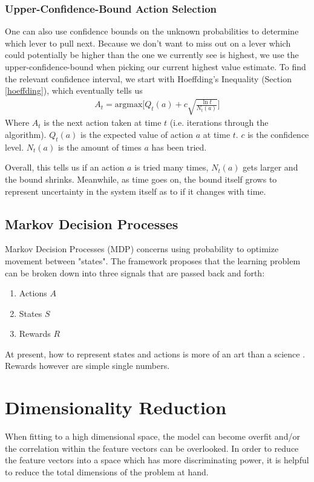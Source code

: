 \subsubsection{Upper-Confidence-Bound Action Selection}

One can also use confidence bounds on the unknown probabilities to determine which lever to pull next. Because we don't want to miss out on a lever which could potentially be higher than the one we currently see is highest, we use the upper-confidence-bound when picking our current highest value estimate. To find the relevant confidence interval, we start with Hoeffding's Inequality (Section \ref{hoeffding}), which eventually tells us
\begin{align}
	A_t = \textrm{argmax}\Big[Q_t(a) + c\sqrt{\frac{\ln t}{N_t(a)}}\Big]
\end{align}
Where $A_t$ is the next action taken at time $t$ (i.e. iterations through the algorithm). $Q_t(a)$ is the expected value of action $a$ at time $t$. $c$ is the confidence level. $N_t(a)$ is the amount of times $a$ has been tried.

Overall, this tells us if an action $a$ is tried many times, $N_t(a)$ gets larger and the bound shrinks. Meanwhile, as time goes on, the bound itself grows to represent uncertainty in the system itself as to if it changes with time.


\subsection{Markov Decision Processes}
Markov Decision Processes (MDP) concerns using probability to optimize movement between "states". The framework proposes that the learning problem can be broken down into three signals that are passed back and forth: 
\begin{enumerate}
	\item Actions $A$
	\item States $S$
	\item Rewards $R$
\end{enumerate}
At present, how to represent states and actions is more of an art than a science \cite{sutton}. Rewards however are simple single numbers.



\section{Dimensionality Reduction}\label{dim_red}
When fitting to a high dimensional space, the model can become overfit and/or the correlation within the feature vectors can be overlooked. In order to reduce the feature vectors into a space which has more discriminating power, it is helpful to reduce the total dimensions of the problem at hand.

